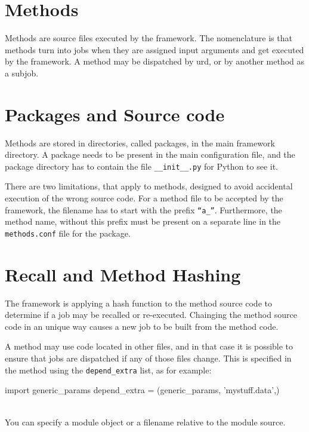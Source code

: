 \section{Methods}

Methods are source files executed by the framework.  The nomenclature
is that methods turn into jobs when they are assigned input arguments
and get executed by the framework.  A method may be dispatched by urd,
or by another method as a subjob.



\section{Packages and Source code}

Methods are stored in directories, called packages, in the main
framework directory.  A package needs to be present in the main
configuration file, and the package directory has to contain the file
\texttt{\_\_init\_\_.py} for Python to see it.

There are two limitations, that apply to methods, designed to avoid
accidental execution of the wrong source code.  For a method file to
be accepted by the framework, the filename has to start with the
prefix \texttt{``a\_''}.  Furthermore, the method name, without this
prefix must be present on a separate line in the \texttt{methods.conf}
file for the package.



\section{Recall and Method Hashing}

The framework is applying a hash function to the method source code to
determine if a job may be recalled or re-executed.  Chainging the
method source code in an unique way causes a new job to be built from
the method code.

A method may use code located in other files, and in that case it is
possible to ensure that jobs are dispatched if any of those files
change.  This is specified in the method using the
\texttt{depend\_extra} list, as for example:
\\
\begin{python}
import generic_params
depend_extra = (generic_params, 'mystuff.data',)
\end{python}
\\
You can specify a module object or a filename relative to the module
source.

